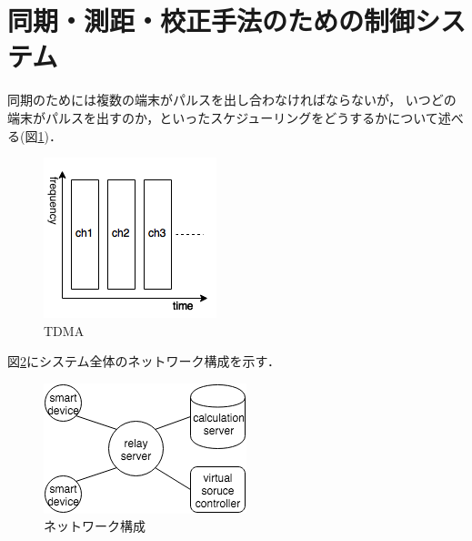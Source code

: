 
\section{同期・測距・校正手法のための制御システム}
同期のためには複数の端末がパルスを出し合わなければならないが，
いつどの端末がパルスを出すのか，といったスケジューリングをどうするかについて述べる(図\ref{fig:TDMA})．

\begin{figure}[p]\centering
  \hspace{-2mm}\includegraphics[clip,width=1.1\hsize]{img/TDMA.png}
  \caption{TDMA}\label{fig:TDMA}
\end{figure}

図\ref{fig:network2}にシステム全体のネットワーク構成を示す．

\begin{figure}[p]\centering
  \hspace{-2mm}\includegraphics[clip,width=1.1\hsize]{img/network2.png}
  \caption{ネットワーク構成}\label{fig:network2}
\end{figure}

